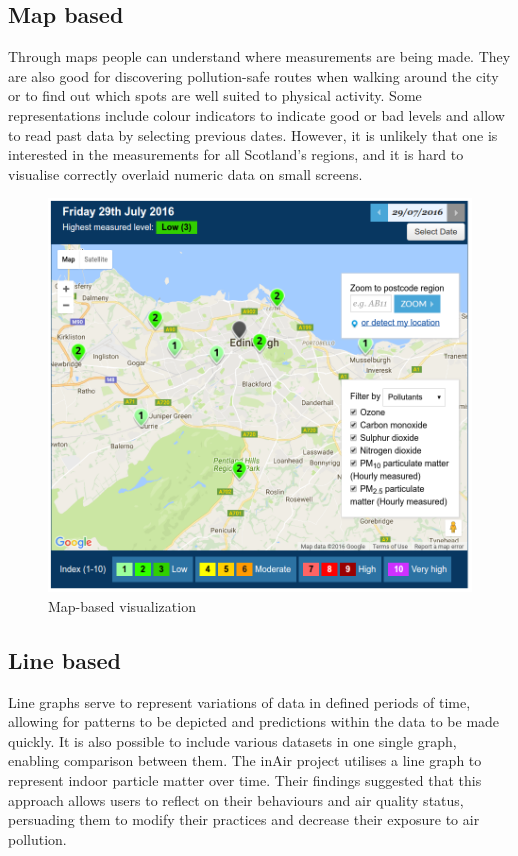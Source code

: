 \subsection{Map based}
Through maps people can understand where measurements are being made. They are also good for discovering pollution-safe routes when walking around the city or to find out which spots are well suited to physical activity.  Some representations include colour indicators to indicate good or bad levels and allow to read past data by selecting previous dates. However, it is unlikely that one is interested in the measurements for all Scotland's regions, and it is hard to visualise correctly overlaid numeric data on small screens.

\begin{figure}[H]
\begin{adjustbox}{width=1\textwidth,center=\textwidth}
  \centering
  \includegraphics[scale=.30]{images/map_visualization.png}
\end{adjustbox}
  \caption[Map-based visualization]{Map-based visualization \cite{Scottishairquality.co.uk2016}}
  \label{fig:web_based_desktop_visualization}
\end{figure}


\subsection{Line based}
Line graphs serve to represent variations of data in defined periods of time, allowing for patterns to be depicted and predictions within the data to be made quickly. It is also possible to include various datasets in one single graph, enabling comparison between them. The inAir project \cite{Kim2013} utilises a line graph to represent indoor particle matter over time. Their findings suggested that this approach allows users to reflect on their behaviours and air quality status, persuading them to modify their practices and decrease their exposure to air pollution. 


